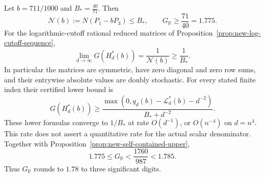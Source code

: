 \begin{theorem}
\label{thm:new-final-goal-global-norm}
Let $b=711/1000$ and $B_*=\frac{40}{71}$. Then
\[
 \mathcal N(b):=N(P_1-bP_3)\leq B_*,\qquad
 G_{\mathbb R}\geq \frac{71}{40}=1.775.
\]
For the logarithmic-cutoff rational reduced matrices of
Proposition~\ref{prop:new-log-cutoff-sequence},
\[
 \lim_{d\to\infty}G(H_d^*(b))=\frac1{\mathcal N(b)}\geq\frac1{B_*}.
\]
In particular the matrices are symmetric, have zero diagonal and zero row
sums, and their entrywise absolute values are doubly stochastic.
For every stated finite index their certified lower bound is
\[
 G(H_d^*(b))\geq
 \frac{\max(0,q_d(b)-\mathcal L_d^*(b)-d^{-2})}{B_*+d^{-2}}.
\]
These lower formulas converge to $1/B_*$ at rate $O(d^{-1})$, or
$O(n^{-4})$ on $d=n^4$. This rate does not assert a quantitative rate
for the actual scalar denominator.
Together with Proposition~\ref{prop:new-self-contained-upper},
\[
 1.775\leq G_{\mathbb R}<\frac{1760}{987}<1.785.
\]
Thus $G_{\mathbb R}$ rounds to $1.78$ to three significant digits.
\end{theorem}
